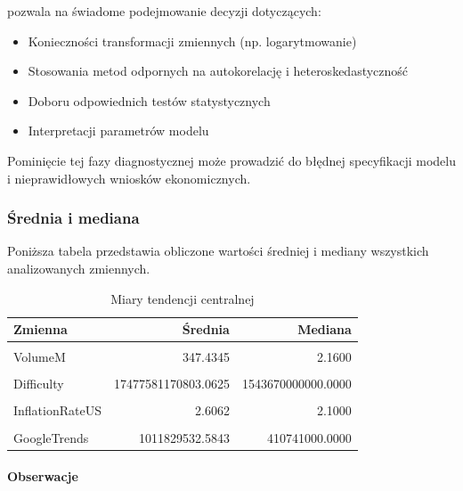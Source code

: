 \documentclass[
  11pt,
]{article}
\begin{document}
pozwala na świadome podejmowanie decyzji dotyczących:

\begin{itemize}
\item
  Konieczności transformacji zmiennych (np. logarytmowanie)
\item
  Stosowania metod odpornych na autokorelację i heteroskedastyczność
\item
  Doboru odpowiednich testów statystycznych
\item
  Interpretacji parametrów modelu
\end{itemize}

Pominięcie tej fazy diagnostycznej może prowadzić do błędnej
specyfikacji modelu i nieprawidłowych wniosków ekonomicznych.

\subsubsection{Średnia i mediana}\label{ux15brednia-i-mediana}

Poniższa tabela przedstawia obliczone wartości średniej i mediany
wszystkich analizowanych zmiennych.

\begin{table}[!h]
\centering
\caption{\label{tab:unnamed-chunk-2}Miary tendencji centralnej}
\centering
\begin{tabular}[t]{lrr}
\toprule
Zmienna & Średnia & Mediana\\
\midrule
\cellcolor{gray!10}{Price} & \cellcolor{gray!10}{16412.5051} & \cellcolor{gray!10}{4231.4500}\\
VolumeM & 347.4345 & 2.1600\\
\cellcolor{gray!10}{USAvgKWHPrice} & \cellcolor{gray!10}{0.1429} & \cellcolor{gray!10}{0.1370}\\
Difficulty & 17477581170803.0625 & 1543670000000.0000\\
\cellcolor{gray!10}{BTCCirculation} & \cellcolor{gray!10}{15253093.2135} & \cellcolor{gray!10}{16741181.0000}\\
\addlinespace
InflationRateUS & 2.6062 & 2.1000\\
\cellcolor{gray!10}{HasMuskMentioned} & \cellcolor{gray!10}{0.1685} & \cellcolor{gray!10}{0.0000}\\
GoogleTrends & 1011829532.5843 & 410741000.0000\\
\bottomrule
\end{tabular}
\end{table}

\paragraph{\texorpdfstring{Obserwacje
\newline}{Obserwacje }}\label{obserwacje}
\end{document}
